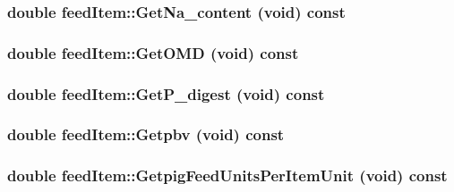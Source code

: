 \label{classfeed_item_aa8f5021c52de69702c08d5c8bb543a49}
\hypertarget{classfeed_item_a0f82281bae07b0e543d12b3bcd73ffb7}{
\subsubsection[{GetNa\_\-content}]{\setlength{\rightskip}{0pt plus 5cm}double feedItem::GetNa\_\-content (void) const}}
\label{classfeed_item_a0f82281bae07b0e543d12b3bcd73ffb7}
\hypertarget{classfeed_item_a94fa874b2d66b1443fc2ebc26d4529aa}{
\subsubsection[{GetOMD}]{\setlength{\rightskip}{0pt plus 5cm}double feedItem::GetOMD (void) const}}
\label{classfeed_item_a94fa874b2d66b1443fc2ebc26d4529aa}
\hypertarget{classfeed_item_a7cdd42f66932edf929ceb2cc722a9388}{
\subsubsection[{GetP\_\-digest}]{\setlength{\rightskip}{0pt plus 5cm}double feedItem::GetP\_\-digest (void) const}}
\label{classfeed_item_a7cdd42f66932edf929ceb2cc722a9388}
\hypertarget{classfeed_item_a1092222b8a89b1da63be44700369ba98}{
\subsubsection[{Getpbv}]{\setlength{\rightskip}{0pt plus 5cm}double feedItem::Getpbv (void) const}}
\label{classfeed_item_a1092222b8a89b1da63be44700369ba98}
\hypertarget{classfeed_item_ab3a6d62f0c19c58dc8437779ee7be171}{
\subsubsection[{GetpigFeedUnitsPerItemUnit}]{\setlength{\rightskip}{0pt plus 5cm}double feedItem::GetpigFeedUnitsPerItemUnit (void) const}}
